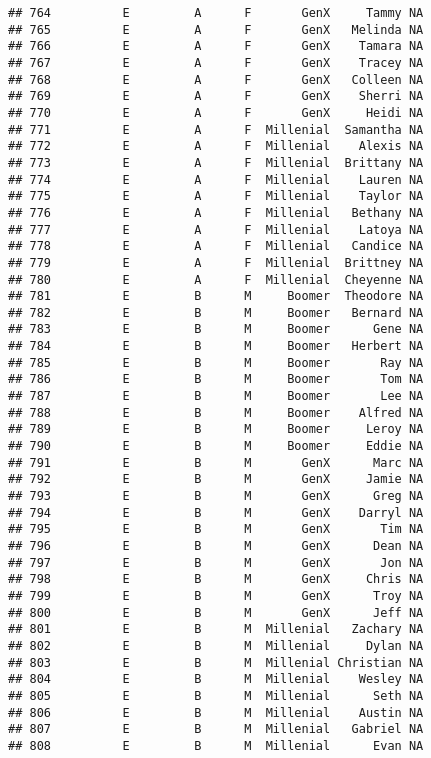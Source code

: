 \documentclass[
]{article}
\begin{document}
\begin{verbatim}
## 764          E         A      F       GenX     Tammy NA
## 765          E         A      F       GenX   Melinda NA
## 766          E         A      F       GenX    Tamara NA
## 767          E         A      F       GenX    Tracey NA
## 768          E         A      F       GenX   Colleen NA
## 769          E         A      F       GenX    Sherri NA
## 770          E         A      F       GenX     Heidi NA
## 771          E         A      F  Millenial  Samantha NA
## 772          E         A      F  Millenial    Alexis NA
## 773          E         A      F  Millenial  Brittany NA
## 774          E         A      F  Millenial    Lauren NA
## 775          E         A      F  Millenial    Taylor NA
## 776          E         A      F  Millenial   Bethany NA
## 777          E         A      F  Millenial    Latoya NA
## 778          E         A      F  Millenial   Candice NA
## 779          E         A      F  Millenial  Brittney NA
## 780          E         A      F  Millenial  Cheyenne NA
## 781          E         B      M     Boomer  Theodore NA
## 782          E         B      M     Boomer   Bernard NA
## 783          E         B      M     Boomer      Gene NA
## 784          E         B      M     Boomer   Herbert NA
## 785          E         B      M     Boomer       Ray NA
## 786          E         B      M     Boomer       Tom NA
## 787          E         B      M     Boomer       Lee NA
## 788          E         B      M     Boomer    Alfred NA
## 789          E         B      M     Boomer     Leroy NA
## 790          E         B      M     Boomer     Eddie NA
## 791          E         B      M       GenX      Marc NA
## 792          E         B      M       GenX     Jamie NA
## 793          E         B      M       GenX      Greg NA
## 794          E         B      M       GenX    Darryl NA
## 795          E         B      M       GenX       Tim NA
## 796          E         B      M       GenX      Dean NA
## 797          E         B      M       GenX       Jon NA
## 798          E         B      M       GenX     Chris NA
## 799          E         B      M       GenX      Troy NA
## 800          E         B      M       GenX      Jeff NA
## 801          E         B      M  Millenial   Zachary NA
## 802          E         B      M  Millenial     Dylan NA
## 803          E         B      M  Millenial Christian NA
## 804          E         B      M  Millenial    Wesley NA
## 805          E         B      M  Millenial      Seth NA
## 806          E         B      M  Millenial    Austin NA
## 807          E         B      M  Millenial   Gabriel NA
## 808          E         B      M  Millenial      Evan NA

\end{verbatim}
\end{document}
